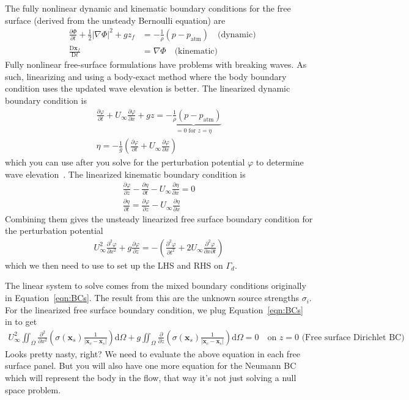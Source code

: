 \documentclass[10pt]{article}
\newcommand{\pp}[2]{\frac{\partial #1}{\partial #2}}
\newcommand{\ppt}[2]{\frac{\partial^2 #1}{\partial #2^2}}
\newcommand{\DD}[2]{\frac{\textrm{D} #1}{\textrm{D} #2}}
\newcommand{\mbf}[1]{\mathbf{#1}}
\newcommand{\half}{\frac{1}{2}}
\newcommand{\be}{\begin{eqnarray}}
\newcommand{\ee}{\end{eqnarray}}
\newcommand{\ben}{\begin{eqnarray*}}
\newcommand{\een}{\end{eqnarray*}}
\newcommand{\Uinf}{U_{\infty}}
\newcommand{\patm}{p_{\textrm{atm}}}
\newcommand{\tn}[1]{\textrm{#1}}
\begin{document}
The fully nonlinear dynamic and kinematic boundary conditions for the free surface (derived from the unsteady Bernoulli equation) are
\be
\label{eqn:FSBC}
& {\pp{\Phi}{t}}
+ \half \left| \nabla \Phi \right|^2
+ gz_f
&=
-\frac{1}{\rho}\left(p - p_{\tn{atm}}\right)
\quad \tn{(dynamic)}
\\
& \DD{\mbf{x}_f}{t} & = \nabla \Phi \quad \tn{(kinematic)}
\ee
Fully nonlinear free-surface formulations have problems with breaking waves.
As such, linearizing and using a body-exact method where the body boundary condition uses the updated wave elevation is better.
The linearized dynamic boundary condition is
\be
\label{eqn:DFSBC}
{\pp{\varphi}{t}} + \Uinf\pp{\varphi}{x} + g z
=
\underbrace{
    -\frac{1}{\rho}\left(p - \patm\right)}_{=0 \tn{ for } z = \eta}
\\
\eta = -\frac{1}{g}
\left(
\pp{\varphi}{t} + \Uinf \pp{\varphi}{x}
\right)
\ee
which you can use after you solve for the perturbation potential $\varphi$ to determine wave elevation~\cite{Hess1967a}.
The linearized kinematic boundary condition is
\be
\label{eqn:KFSBC}
\pp{\varphi}{z} - \pp{\eta}{t} - \Uinf \pp{\eta}{x} = 0 \\
\pp{\eta}{t} = \pp{\varphi}{z} - \Uinf \pp{\eta}{x}
\ee
Combining them gives the unsteady linearized free surface boundary condition for the perturbation potential
\be
\label{eqn:LSFSBC}
\boxed{\Uinf^2 \ppt{\varphi}{x} + g\pp{\varphi}{z}}
= - \left( \ppt{\varphi}{t}
+ 2 \Uinf \frac{\partial^2 \varphi}{\partial x \partial t}
\right)
\ee
which we then need to use to set up the LHS and RHS on $\Gamma_d$.

The linear system to solve comes from the mixed boundary conditions originally in Equation~\eqref{eqn:BCs}.
The result from this are the unknown source strengths $\sigma_i$.
For the linearized free surface boundary condition, we plug Equation~\eqref{eqn:BCs} in to get
\be
\Uinf^2  \iint_{\Omega}\ppt{   }{x}
\left(
\sigma(\mbf{x}_s) \frac{1}{\left| \mbf{x}_c - \mbf{x}_s\right|}
\right)
\tn{d}\Omega
+ g
\iint_{\Omega} \pp{}{z} \left(
\sigma(\mbf{x}_s) \frac{1}{\left| \mbf{x}_c - \mbf{x}_s  \right| }
\right)
\tn{d}\Omega
= 0
\quad \tn{on } z=0 \tn{ (Free surface Dirichlet BC)}
\ee
Looks pretty nasty, right?
We need to evaluate the above equation in each free surface panel.
But you will also have one more equation for the Neumann BC which will represent the body in the flow, that way it's not just solving a null space problem.

\end{document}
